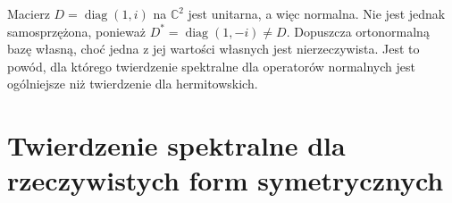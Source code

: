 \begin{przyklad}
\label{prz:lin14-normal-not-hermitian}
Macierz \(D=\operatorname{diag}(1,i)\)
na \(\mathbb C^2\) jest unitarna,
a więc normalna.
Nie jest jednak samosprzężona,
ponieważ
\(D^*=\operatorname{diag}(1,-i)\ne D\).
Dopuszcza ortonormalną bazę własną,
choć jedna z jej wartości własnych
jest nierzeczywista.
Jest to powód, dla którego
twierdzenie spektralne dla
operatorów normalnych jest ogólniejsze
niż twierdzenie dla hermitowskich.
\end{przyklad}


\section{Twierdzenie spektralne dla rzeczywistych form symetrycznych}
\label{sec:lin14-real}


